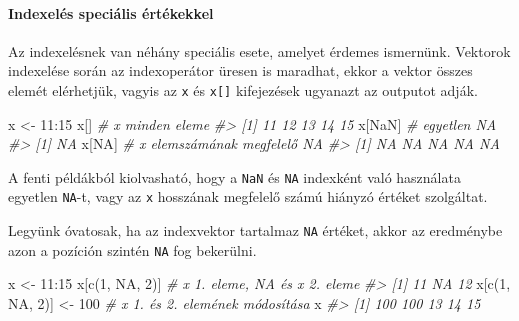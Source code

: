 \documentclass[
]{book}
\newenvironment{Shaded}{\begin{snugshade}}{\end{snugshade}}
\newcommand{\CommentTok}[1]{\textcolor[rgb]{0.56,0.35,0.01}{\textit{#1}}}
\newcommand{\ConstantTok}[1]{\textcolor[rgb]{0.00,0.00,0.00}{#1}}
\newcommand{\DecValTok}[1]{\textcolor[rgb]{0.00,0.00,0.81}{#1}}
\newcommand{\FunctionTok}[1]{\textcolor[rgb]{0.00,0.00,0.00}{#1}}
\newcommand{\NormalTok}[1]{#1}
\newcommand{\OtherTok}[1]{\textcolor[rgb]{0.56,0.35,0.01}{#1}}
\newcommand{\SpecialCharTok}[1]{\textcolor[rgb]{0.00,0.00,0.00}{#1}}
\begin{document}
\hypertarget{indexelesspecna}{%
\paragraph{Indexelés speciális értékekkel}\label{indexelesspecna}}

Az indexelésnek van néhány speciális esete, amelyet érdemes ismernünk. Vektorok indexelése során az indexoperátor üresen is maradhat, ekkor a vektor összes elemét elérhetjük, vagyis az \texttt{x} és \texttt{x{[}{]}} kifejezések ugyanazt az outputot adják.

\begin{Shaded}
\begin{Highlighting}[]
\NormalTok{x }\OtherTok{\textless{}{-}} \DecValTok{11}\SpecialCharTok{:}\DecValTok{15}
\NormalTok{x[]           }\CommentTok{\# x minden eleme}
\CommentTok{\#\textgreater{} [1] 11 12 13 14 15}
\NormalTok{x[}\ConstantTok{NaN}\NormalTok{]        }\CommentTok{\# egyetlen NA}
\CommentTok{\#\textgreater{} [1] NA}
\NormalTok{x[}\ConstantTok{NA}\NormalTok{]         }\CommentTok{\# x elemszámának megfelelő NA   }
\CommentTok{\#\textgreater{} [1] NA NA NA NA NA}
\end{Highlighting}
\end{Shaded}

A fenti példákból kiolvasható, hogy a \texttt{NaN} és \texttt{NA} indexként való használata egyetlen \texttt{NA}-t, vagy az \texttt{x} hosszának megfelelő számú hiányzó értéket szolgáltat.

Legyünk óvatosak, ha az indexvektor tartalmaz \texttt{NA} értéket, akkor az eredménybe azon a pozíción szintén \texttt{NA} fog bekerülni.

\begin{Shaded}
\begin{Highlighting}[]
\NormalTok{x }\OtherTok{\textless{}{-}} \DecValTok{11}\SpecialCharTok{:}\DecValTok{15}
\NormalTok{x[}\FunctionTok{c}\NormalTok{(}\DecValTok{1}\NormalTok{, }\ConstantTok{NA}\NormalTok{, }\DecValTok{2}\NormalTok{)]          }\CommentTok{\# x 1. eleme, NA és x 2. eleme}
\CommentTok{\#\textgreater{} [1] 11 NA 12}
\NormalTok{x[}\FunctionTok{c}\NormalTok{(}\DecValTok{1}\NormalTok{, }\ConstantTok{NA}\NormalTok{, }\DecValTok{2}\NormalTok{)] }\OtherTok{\textless{}{-}} \DecValTok{100}   \CommentTok{\# x 1. és 2. elemének módosítása}
\NormalTok{x}
\CommentTok{\#\textgreater{} [1] 100 100  13  14  15}
\end{Highlighting}
\end{Shaded}
\end{document}
